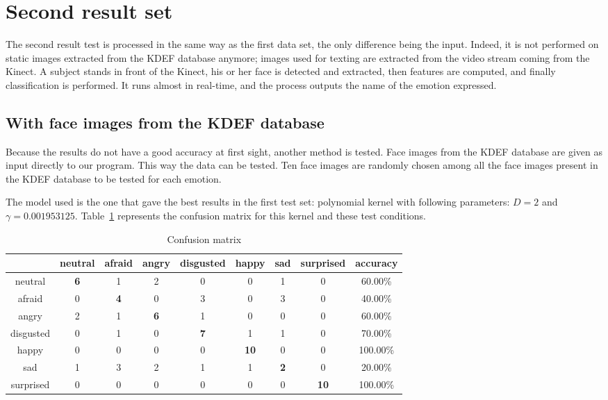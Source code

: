 \section{Second result set}

\vspace{\baselineskip}
\noindent The second result test is processed in the same way as the first data set, the only difference being the input. Indeed, it is not performed on static images extracted from the KDEF database anymore; images used for texting are extracted from the video stream coming from the Kinect. A subject stands in front of the Kinect, his or her face is detected and extracted, then features are computed, and finally classification is performed. It runs almost in real-time, and the process outputs the name of the emotion expressed.
\newline

\subsection{With face images from the KDEF database}

\vspace{\baselineskip}
\noindent Because the results do not have a good accuracy at first sight, another method is tested. Face images from the KDEF database are given as input directly to our program. This way the data can be tested. Ten face images are randomly chosen among all the face images present in the KDEF database to be tested for each emotion. 
\newline

\noindent The model used is the one that gave the best results in the first test set: polynomial kernel with following parameters: $ D = 2 $ and $ \gamma = 0.001953125 $. Table~\ref{table_results_confusion_matrix_offline} represents the confusion matrix for this kernel and these test conditions.
\newline

\begin{table}[h]
\begin{center}
   \caption{\label{table_results_confusion_matrix_offline} Confusion matrix}
\begin{tabular}{|c|c|c|c|c|c|c|c|c|}
  \hline
   & neutral & afraid & angry & disgusted & happy & sad & surprised & accuracy \\
  \hline
  neutral & \textbf{6} & 1 & 2 & 0 & 0 & 1 & 0 & 60.00\% \\
  afraid & 0 & \textbf{4} & 0 & 3 & 0 & 3 & 0 & 40.00\% \\
  angry & 2 & 1 & \textbf{6} & 1 & 0 & 0 & 0 & 60.00\% \\
  disgusted & 0 & 1 & 0 & \textbf{7} & 1 & 1 & 0 & 70.00\% \\
  happy & 0 & 0 & 0 & 0 & \textbf{10} & 0 & 0 & 100.00\% \\
  sad & 1 & 3 & 2 & 1 & 1 & \textbf{2} & 0 & 20.00\% \\
  surprised & 0 & 0 & 0 & 0 & 0 & 0 & \textbf{10} & 100.00\%\\
  \hline
\end{tabular}
\end{center}
\end{table}

